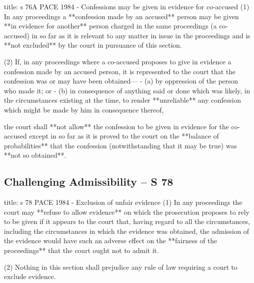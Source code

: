 \documentclass[
]{article}
\newenvironment{Shaded}{}{}
\newcommand{\NormalTok}[1]{#1}
\begin{document}
\begin{Shaded}
\begin{Highlighting}[]
\NormalTok{title: s 76A PACE 1984 {-} Confessions may be given in evidence for co{-}accused}
\NormalTok{(1) In any proceedings a **confession made by an accused** person may be given **in evidence for another** person charged in the same proceedings (a co{-}accused) in so far as it is relevant to any matter in issue in the proceedings and is **not excluded** by the court in pursuance of this section.}

\NormalTok{(2) If, in any proceedings where a co{-}accused proposes to give in evidence a confession made by an accused person, it is represented to the court that the confession was or may have been obtained—}
\NormalTok{{-} (a) by oppression of the person who made it; or}
\NormalTok{{-} (b) in consequence of anything said or done which was likely, in the circumstances existing at the time, to render **unreliable** any confession which might be made by him in consequence thereof,}

\NormalTok{the court shall **not allow** the confession to be given in evidence for the co{-}accused except in so far as it is proved to the court on the **balance of probabilities** that the confession (notwithstanding that it may be true) was **not so obtained**.}
\end{Highlighting}
\end{Shaded}

\hypertarget{challenging-admissibility-s-78}{%
\subsection{Challenging Admissibility -- S
78}\label{challenging-admissibility-s-78}}

\begin{Shaded}
\begin{Highlighting}[]
\NormalTok{title: s 78 PACE 1984 {-} Exclusion of unfair evidence}
\NormalTok{(1) In any proceedings the court may **refuse to allow evidence** on which the prosecution proposes to rely to be given if it appears to the court that, having regard to all the circumstances, including the circumstances in which the evidence was obtained, the admission of the evidence would have such an adverse effect on the **fairness of the proceedings** that the court ought not to admit it.}

\NormalTok{(2) Nothing in this section shall prejudice any rule of law requiring a court to exclude evidence.}
\end{Highlighting}
\end{Shaded}
\end{document}
